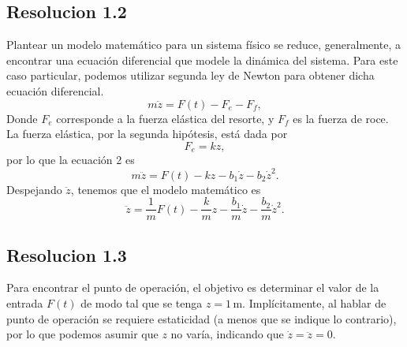 \documentclass[
  11pt,
  letterpaper,
   addpoints,
   answers
  ]{exam}
\begin{document}
\begin{questions}
\begin{solution}
\subsection*{Resolucion 1.2}
Plantear un modelo matemático para un sistema físico se reduce, generalmente, a encontrar una ecuación diferencial que modele la dinámica del sistema. Para este caso particular, podemos utilizar segunda ley de Newton para obtener dicha ecuación diferencial.
\begin{equation}
    m\ddot{z} = F(t) - F_e - F_f, \tag{2}
\end{equation}
Donde $F_e$ corresponde a la fuerza elástica del resorte, y $F_f$ es la fuerza de roce. La fuerza elástica, por la segunda hipótesis, está dada por
\begin{equation}
    F_e = kz, \tag{3}
\end{equation}
por lo que la ecuación 2 es
\begin{equation}
    m\ddot{z} = F(t) - kz - b_1\dot{z} - b_2\dot{z}^2. \tag{4}
\end{equation}
Despejando $\ddot{z}$, tenemos que el modelo matemático es
\begin{equation}
    \ddot{z} = \frac{1}{m}F(t) - \frac{k}{m}z - \frac{b_1}{m}\dot{z} - \frac{b_2}{m}\dot{z}^2. \tag{5}
\end{equation}
\subsection*{Resolucion 1.3}
Para encontrar el punto de operación, el objetivo es determinar el valor de la entrada $F(t)$ de modo tal que se tenga $z = 1 \, \text{m}$. Implícitamente, al hablar de punto de operación se requiere estaticidad (a menos que se indique lo contrario), por lo que podemos asumir que $z$ no varía, indicando que $\dot{z} = \ddot{z} = 0$.


\end{solution}
\end{questions}
\end{document}
